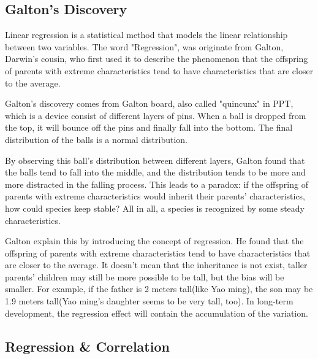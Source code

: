 \documentclass[main]{subfiles}
\begin{document}
\subsection{Galton's Discovery}
Linear regression is a statistical method that models the linear relationship between two variables. The word "Regression", was originate from Galton, Darwin's cousin, who first used it to describe the phenomenon that the offspring of parents with extreme characteristics tend to have characteristics that are closer to the average. \par
Galton's discovery comes from Galton board, also called "quincunx" in PPT, which is a device consist of different layers of pins. When a ball is dropped from the top, it will bounce off the pins and finally fall into the bottom. The final distribution of the balls is a normal distribution.\par
By observing this ball's distribution between different layers, Galton found that the balls tend to fall into the middle, and the distribution tends to be more and more distracted in the falling process. This leads to a paradox: if the offspring of parents with extreme characteristics would inherit their parents' characteristics, how could species keep stable? All in all, a species is recognized by some steady characteristics. \par
Galton explain this by introducing the concept of regression. He found that the offspring of parents with extreme characteristics tend to have characteristics that are closer to the average. It doesn't mean that the inheritance is not exist, taller parents' children may still be more possible to be tall, but the bias will be smaller. For example, if the father is 2 meters tall(like Yao ming), the son may be 1.9 meters tall(Yao ming's daughter seems to be very tall, too). In long-term development, the regression effect will contain the accumulation of the variation. \par


\subsection{Regression \& Correlation}
\end{document}
